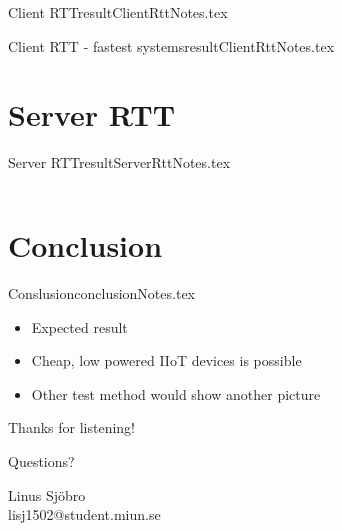 \documentclass{beamer}
\begin{document}
\begin{notedFrame}{Client RTT}{resultClientRttNotes.tex}
\end{notedFrame}

\begin{notedFrame}{Client RTT - fastest systems}{resultClientRttNotes.tex}
\end{notedFrame}


\section{Server RTT}
\begin{notedFrame}{Server RTT}{resultServerRttNotes.tex}

	\begin{columns}[T, onlytextwidth]

			

	\end{columns}
\end{notedFrame}


\section{Conclusion}
\begin{frame}{Conslusion}{conclusionNotes.tex}
	\begin{itemize}
		\item Expected result
		\item Cheap, low powered IIoT devices is possible
		\item Other test method would show another picture
	\end{itemize}
\end{frame}


\begin{frame}[standout]
	Thanks for listening! 

	Questions?
	
	\bigskip
	
	\textnormal{
		Linus Sjöbro \\
		lisj1502@student.miun.se
	}

\end{frame}
\end{document}
